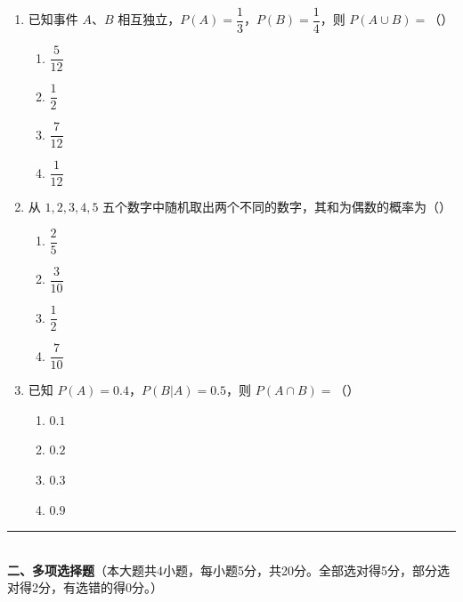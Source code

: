 \documentclass[12pt, a4paper]{ctexart}
\begin{document}
\begin{enumerate}
\item 已知事件 $A$、$B$ 相互独立，$P(A)=\dfrac{1}{3}$，$P(B)=\dfrac{1}{4}$，则 $P(A\cup B)=$（\quad）
  \begin{enumerate}[label=\Alph*., itemsep=0pt]
    \item $\dfrac{5}{12}$ \quad \item $\dfrac{1}{2}$ \quad \item $\dfrac{7}{12}$ \quad \item $\dfrac{1}{12}$
  \end{enumerate}

\item 从 $1,2,3,4,5$ 五个数字中随机取出两个不同的数字，其和为偶数的概率为（\quad）
  \begin{enumerate}[label=\Alph*., itemsep=0pt]
    \item $\dfrac{2}{5}$ \quad \item $\dfrac{3}{10}$ \quad \item $\dfrac{1}{2}$ \quad \item $\dfrac{7}{10}$
  \end{enumerate}

\item 已知 $P(A)=0.4$，$P(B|A)=0.5$，则 $P(A\cap B)=$（\quad）
  \begin{enumerate}[label=\Alph*., itemsep=0pt]
    \item $0.1$ \quad \item $0.2$ \quad \item $0.3$ \quad \item $0.9$
  \end{enumerate}
\end{enumerate}

\vspace{6pt}

\noindent\rule{\textwidth}{0.4pt}\\[2pt]
{\large\bfseries 二、多项选择题}（本大题共4小题，每小题5分，共20分。全部选对得5分，部分选对得2分，有选错的得0分。）

\vspace{6pt}
\end{document}
